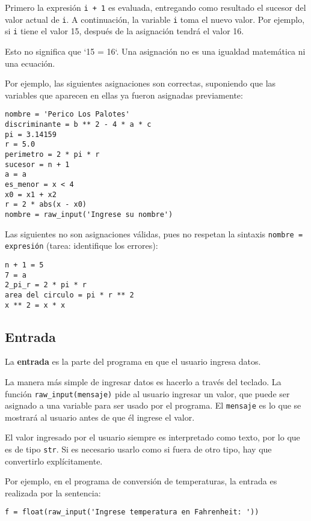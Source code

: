 Primero la expresión \lstinline!i + 1! es evaluada, entregando como
resultado el sucesor del valor actual de \lstinline!i!. A continuación,
la variable \lstinline!i! toma el nuevo valor. Por ejemplo, si
\lstinline!i! tiene el valor 15, después de la asignación tendrá el
valor 16.

Esto no significa que `15 = 16`. Una asignación no es una igualdad
matemática ni una ecuación.

Por ejemplo, las siguientes asignaciones son correctas, suponiendo que
las variables que aparecen en ellas ya fueron asignadas previamente:

\begin{lstlisting}
nombre = 'Perico Los Palotes'
discriminante = b ** 2 - 4 * a * c
pi = 3.14159
r = 5.0
perimetro = 2 * pi * r
sucesor = n + 1
a = a
es_menor = x < 4
x0 = x1 + x2
r = 2 * abs(x - x0)
nombre = raw_input('Ingrese su nombre')
\end{lstlisting}

Las siguientes no son asignaciones válidas, pues no respetan la sintaxis
\lstinline!nombre = expresión! (tarea: identifique los errores):

\begin{lstlisting}
n + 1 = 5
7 = a
2_pi_r = 2 * pi * r
area del circulo = pi * r ** 2
x ** 2 = x * x
\end{lstlisting}

\subsection{Entrada}

La \textbf{entrada} es la parte del programa en que el usuario ingresa
datos.

La manera más simple de ingresar datos es hacerlo a través del teclado.
La función \lstinline!raw_input(mensaje)! pide al usuario ingresar un
valor, que puede ser asignado a una variable para ser usado por el
programa. El \lstinline!mensaje! es lo que se mostrará al usuario antes
de que él ingrese el valor.

El valor ingresado por el usuario siempre es interpretado como texto,
por lo que es de tipo \lstinline!str!. Si es necesario usarlo como si
fuera de otro tipo, hay que convertirlo explícitamente.

Por ejemplo, en el programa de conversión de temperaturas, la entrada es
realizada por la sentencia:

\begin{lstlisting}
f = float(raw_input('Ingrese temperatura en Fahrenheit: '))
\end{lstlisting}

